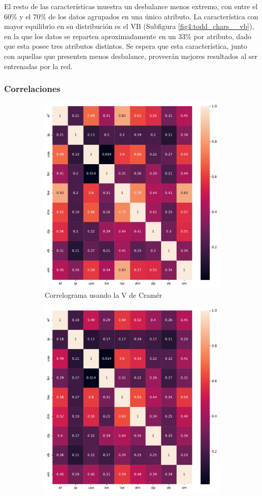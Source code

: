 El resto de las características muestra un desbalance menos extremo, con entre el 60\% y el 70\% de los datos agrupados en una único atributo. La característica con mayor equilibrio en su distribución es el VB (Subfigura \ref{fig4:todd_chars__vb}), en la que los datos se reparten aproximadamente en un 33\% por atributo, dado que esta posee tres atributos distintos. Se espera que esta característica, junto con aquellas que presenten menos desbalance, proveerán mejores resultados al ser entrenadas por la red.

\subsubsection{Correlaciones}

\begin{figure}[p]
    \centering
    \begin{subfigure}{\textwidth}
        \centering
        \includegraphics[width=0.7\linewidth]{../../scripts/eda/assoc_plot_cramersv.pdf}
        \caption{Correlograma usando la V de Cramér}
        \label{fig4:todd_chars__cramersv}
    \end{subfigure}
    \begin{subfigure}{\textwidth}
        \centering
        \includegraphics[width=0.7\linewidth]{../../scripts/eda/assoc_plot_tschuprow.pdf}

\end{subfigure}
\end{figure}
